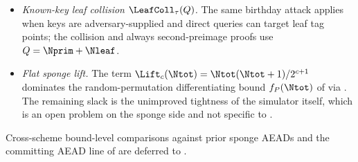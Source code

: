 \begin{itemize}
  coupling; their nonce-respecting encryption rules this attack out, so
  there it is inherited slack.
\item \emph{Known-key leaf collision $\LeafColl_\tau(Q)$.} The same
  birthday attack applies when keys are adversary-supplied and direct
  queries can target leaf tag points; the collision and
  always second-preimage proofs use $Q=\Nprim+\Nleaf$.
\item \emph{Flat sponge lift.} The term
  $\Lift_c(\Ntot) = \Ntot(\Ntot + 1) / 2^{c + 1}$ dominates the
  random-permutation differentiating bound $f_P(\Ntot)$ of
  \cite[Lemma~5]{BDPV08} via . The
  remaining slack is the unimproved
  tightness of the \cite{BDPV08} simulator itself, which is an open
  problem on the sponge side and not specific to \TW{}.
\end{itemize}

Cross-scheme bound-level comparisons against prior sponge AEADs and
the committing AEAD line of \cite{BH22} are deferred to
.

